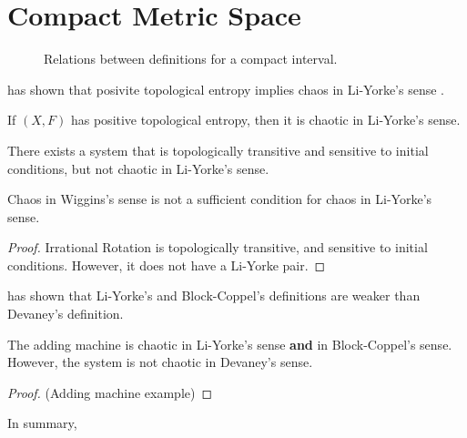 \documentclass[12pt,twoside,draft]{book}
\begin{document}
\section{Compact Metric Space}

\begin{figure}[ht]
  \caption{Relations between definitions for a compact interval.}
\end{figure}

\citet{blanchard} has shown that posivite topological entropy implies chaos in Li-Yorke's sense .
\begin{theorem}
  If $(X,F)$ has positive topological entropy, then it is chaotic in Li-Yorke's sense.
  \label{thm:entropy-liyorke}
\end{theorem}

There exists a system that is topologically transitive and sensitive to initial conditions, but not chaotic in Li-Yorke's sense.
\begin{theorem}
  \citep{blanchard}
  Chaos in Wiggins's sense is not a sufficient condition for chaos in Li-Yorke's sense.  
  \begin{proof}
    Irrational Rotation is topologically transitive, and sensitive to initial conditions.
    However, it does not have a Li-Yorke pair. 
  \end{proof}
\end{theorem}

\citet{aulbach} has shown that Li-Yorke's and Block-Coppel's definitions are weaker than Devaney's definition.
\begin{theorem}
  \citep{aulbach} 
  The adding machine is chaotic in Li-Yorke's sense \textbf{and} in Block-Coppel's sense.
  However, the system is not chaotic in Devaney's sense.
  \begin{proof}
    (Adding machine example)
  \end{proof}
\end{theorem}

In summary,




\printindex
\end{document}
